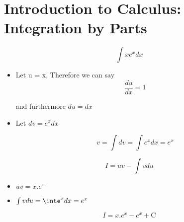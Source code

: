 

\section{Introduction to Calculus: Integration by Parts}

\begin{frame}
\[ \int xe^xdx \]

\begin{itemize}
\item Let u = x, Therefore we can say 
\[ \frac{du}{dx}=1\]

and furthermore $du=dx$

\item Let $dv = e^xdx$

\[ v =\int dv = \int e^xdx =e^x \]

\end{itemize}
\end{frame}

\begin{frame}

\[ I = uv - \int vdu\]
\begin{itemize}
\item $uv = x.e^x$ 
\item $\int vdu = \inte^xdx = e^x$
\end{itemize}


\[ I = x.e^x - e^x  + \mbox{C}\]

\end{frame}
